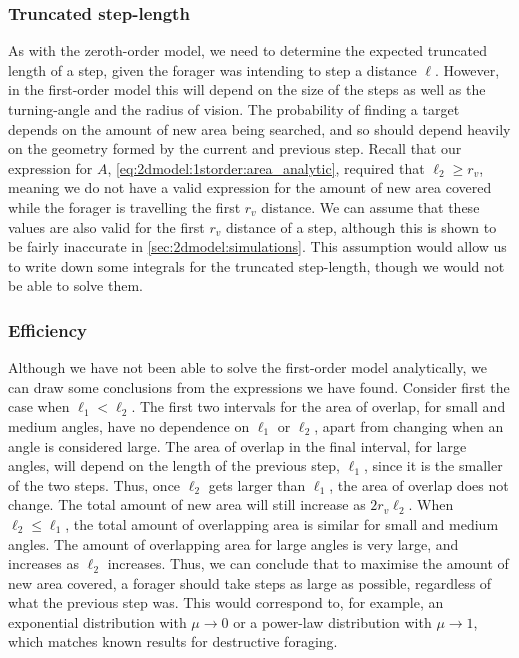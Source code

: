 \subsubsection{Truncated step-length}

As with the zeroth-order model, we need to determine the expected truncated length of a step, given the forager was intending to step a distance $\ell$. 
However, in the first-order model this will depend on the size of the steps as well as the turning-angle and the radius of vision. 
The probability of finding a target depends on the amount of new area being searched, and so should depend heavily on the geometry formed by the current and previous step.
Recall that our expression for $A$, \cref{eq:2dmodel:1storder:area_analytic}, required that $\ell_2 \geq r_v$, meaning we do not have a valid expression for the amount of new area covered while the forager is travelling the first $r_v$ distance.
We can assume that these values are also valid for the first $r_v$ distance of a step, although this is shown to be fairly inaccurate in \cref{sec:2dmodel:simulations}.
This assumption would allow us to write down some integrals for the truncated step-length, though we would not be able to solve them.

\subsubsection{Efficiency}

Although we have not been able to solve the first-order model analytically, we can draw some conclusions from the expressions we have found. Consider first the case when $\ell_1 < \ell_2$. The first two intervals for the area of overlap, for small and medium angles, have no dependence on $\ell_1$ or $\ell_2$, apart from changing when an angle is considered large. The area of overlap in the final interval, for large angles, will depend on the length of the previous step, $\ell_1$, since it is the smaller of the two steps. Thus, once $\ell_2$ gets larger than $\ell_1$, the area of overlap does not change. The total amount of new area will still increase as $2r_v\ell_2$. When $\ell_2 \leq \ell_1$, the total amount of overlapping area is similar for small and medium angles. The amount of overlapping area for large angles is very large, and increases as $\ell_2$ increases. Thus, we can conclude that to maximise the amount of new area covered, a forager should take steps as large as possible, regardless of what the previous step was. This would correspond to, for example, an exponential distribution with $\mu \to 0$ or a power-law distribution with $\mu \to 1$, which matches known results for destructive foraging.


